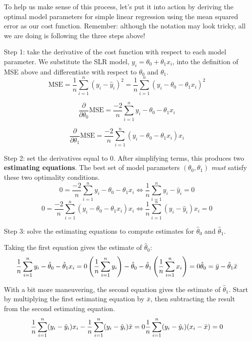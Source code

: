 \documentclass[
  letterpaper,
  DIV=11,
  numbers=noendperiod]{scrreprt}
\begin{document}
To help us make sense of this process, let's put it into action by
deriving the optimal model parameters for simple linear regression using
the mean squared error as our cost function. Remember: although the
notation may look tricky, all we are doing is following the three steps
above!

Step 1: take the derivative of the cost function with respect to each
model parameter. We substitute the SLR model,
\(\hat{y}_i = \theta_0+\theta_1 x_i\), into the definition of MSE above
and differentiate with respect to \(\theta_0\) and \(\theta_1\).
\[\text{MSE} = \frac{1}{n} \sum_{i=1}^{n} (y_i - \hat{y}_i)^2 = \frac{1}{n} \sum_{i=1}^{n} (y_i - \theta_0 - \theta_1 x_i)^2\]

\[\frac{\partial}{\partial \theta_0} \text{MSE} = \frac{-2}{n} \sum_{i=1}^{n} y_i - \theta_0 - \theta_1 x_i\]

\[\frac{\partial}{\partial \theta_1} \text{MSE} = \frac{-2}{n} \sum_{i=1}^{n} (y_i - \theta_0 - \theta_1 x_i)x_i\]

Step 2: set the derivatives equal to 0. After simplifying terms, this
produces two \textbf{estimating equations}. The best set of model
parameters \((\theta_0, \theta_1)\) \emph{must} satisfy these two
optimality conditions.
\[0 = \frac{-2}{n} \sum_{i=1}^{n} y_i - \theta_0 - \theta_1 x_i \Longleftrightarrow \frac{1}{n}\sum_{i=1}^{n} y_i - \hat{y}_i = 0\]
\[0 = \frac{-2}{n} \sum_{i=1}^{n} (y_i - \theta_0 - \theta_1 x_i)x_i \Longleftrightarrow \frac{1}{n}\sum_{i=1}^{n} (y_i - \hat{y}_i)x_i = 0\]

Step 3: solve the estimating equations to compute estimates for
\(\hat{\theta}_0\) and \(\hat{\theta}_1\).

Taking the first equation gives the estimate of \(\hat{\theta}_0\): \[
\frac{1}{n} \sum_{i=1}^n y_i - \hat{\theta}_0 - \hat{\theta}_1 x_i = 0 \\
\left(\frac{1}{n} \sum_{i=1}^n y_i \right) - \hat{\theta}_0 - \hat{\theta}_1\left(\frac{1}{n} \sum_{i=1}^n x_i \right) = 0 \\
\hat{\theta}_0 = \bar{y} - \hat{\theta}_1 \bar{x}
\]

With a bit more maneuvering, the second equation gives the estimate of
\(\hat{\theta}_1\). Start by multiplying the first estimating equation
by \(\bar{x}\), then subtracting the result from the second estimating
equation. \[
\frac{1}{n} \sum_{i=1}^n (y_i - \hat{y}_i)x_i - \frac{1}{n} \sum_{i=1}^n (y_i - \hat{y}_i)\bar{x} = 0 \\
\frac{1}{n} \sum_{i=1}^n (y_i - \hat{y}_i)(x_i - \bar{x}) = 0
\]
\end{document}
